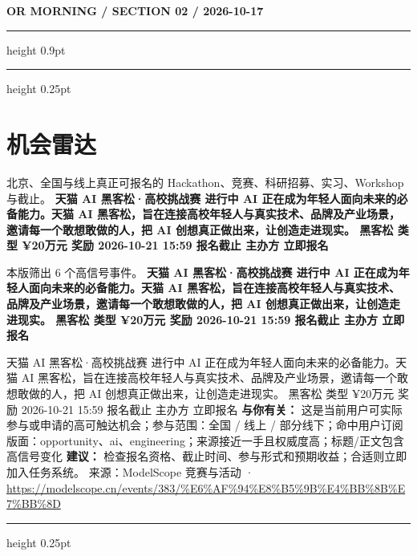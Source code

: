 \documentclass[10.5pt]{ctexart}
\begin{document}
\newpage
{\small\bfseries OR MORNING / SECTION 02 / 2026-10-17}
\vspace{2mm}
\hrule height 0.9pt
\vspace{1.5mm}
\hrule height 0.25pt
\vspace{4mm}
\section*{机会雷达}
{\color{ormuted} 北京、全国与线上真正可报名的 Hackathon、竞赛、科研招募、实习、Workshop 与截止。}
\vspace{2mm}
{\LARGE\bfseries 天猫 AI 黑客松·高校挑战赛 进行中 AI 正在成为年轻人面向未来的必备能力。天猫 AI 黑客松，旨在连接高校年轻人与真实技术、品牌及产业场景，邀请每一个敢想敢做的人，把 AI 创想真正做出来，让创造走进现实。 黑客松 类型 ¥20万元 奖励 2026-10-21 15:59 报名截止 主办方 立即报名}\par
\vspace{1mm}
{\color{ormuted} 本版筛出 6 个高信号事件。}
\vspace{3mm}
{\Large\bfseries 天猫 AI 黑客松·高校挑战赛 进行中 AI 正在成为年轻人面向未来的必备能力。天猫 AI 黑客松，旨在连接高校年轻人与真实技术、品牌及产业场景，邀请每一个敢想敢做的人，把 AI 创想真正做出来，让创造走进现实。 黑客松 类型 ¥20万元 奖励 2026-10-21 15:59 报名截止 主办方 立即报名}\par
天猫 AI 黑客松·高校挑战赛 进行中 AI 正在成为年轻人面向未来的必备能力。天猫 AI 黑客松，旨在连接高校年轻人与真实技术、品牌及产业场景，邀请每一个敢想敢做的人，把 AI 创想真正做出来，让创造走进现实。 黑客松 类型 ¥20万元 奖励 2026-10-21 15:59 报名截止 主办方 立即报名
\textbf{与你有关：} 这是当前用户可实际参与或申请的高可触达机会；参与范围：全国 / 线上 / 部分线下；命中用户订阅版面：opportunity、ai、engineering；来源接近一手且权威度高；标题/正文包含高信号变化
\textbf{建议：} 检查报名资格、截止时间、参与形式和预期收益；合适则立即加入任务系统。
{\footnotesize\color{ormuted} 来源：ModelScope 竞赛与活动 · \url{https://modelscope.cn/events/383/%E6%AF%94%E8%B5%9B%E4%BB%8B%E7%BB%8D}}
\vspace{4mm}
\hrule height 0.25pt
\vspace{3mm}
\end{document}
